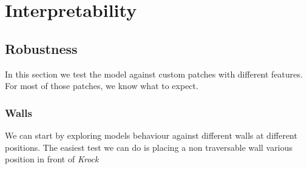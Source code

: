 \documentclass[../document.tex]{subfiles}
\begin{document}
\section{Interpretability}
% 

% 


\subsection{Robustness}
In this section we test the model against custom patches with different features. For most of those patches, we know what to expect.

\subsubsection{Walls}
We can start by exploring models behaviour against different walls at different positions. The easiest test we can do is placing a non traversable wall various position in front of \emph{Krock}
\end{document}
